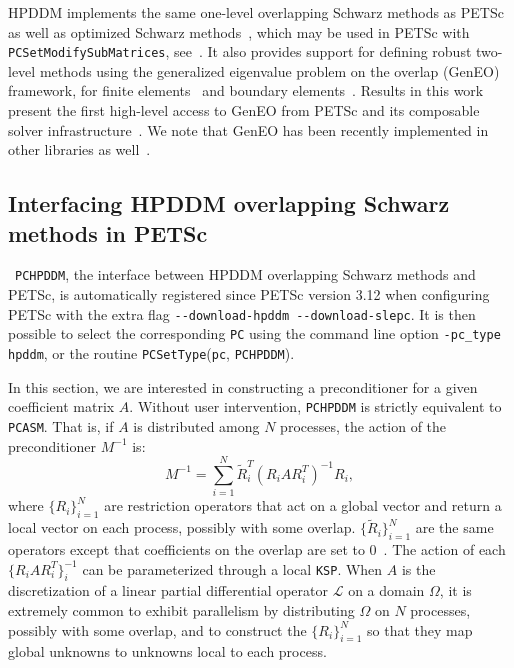 \documentclass[3p,11pt]{elsarticle}
\newcommand{\pk}[1]{\texttt{#1}}
\begin{document}
HPDDM implements the same one-level overlapping Schwarz methods as PETSc as
well as optimized Schwarz methods~\cite{gander2006optimized}, which may be used
in PETSc with \pk{PCSetModifySubMatrices}, see~\cite{gander2019new}.  It also provides support for
defining robust two-level methods using the generalized eigenvalue problem on
the overlap (GenEO) framework, for finite
elements~\cite{spillane2011robust,spillane2013abstract} and boundary
elements~\cite{marchand2019two}. Results in this work present the first
high-level access to GenEO from PETSc and its composable solver
infrastructure~\cite{brown2012composable}. We note that GenEO has been
recently implemented in other libraries as well~\cite{butler2020high}.

  \subsection{Interfacing HPDDM overlapping Schwarz methods in PETSc\label{sec:interface-pc}}\
\pk{PCHPDDM}, the interface between HPDDM overlapping Schwarz methods and
PETSc, is automatically registered since PETSc version 3.12 when configuring
PETSc with the extra flag \pk{-{}-download-hpddm -{}-download-slepc}.  It is
then possible to select the corresponding \pk{PC} using the command line option
\pk{-pc\_type hpddm}, or the routine \pk{PCSetType}(\pk{pc}, \pk{PCHPDDM}).

In this section, we are interested in constructing a preconditioner
for a given coefficient matrix $A$. Without user intervention,
\pk{PCHPDDM} is strictly equivalent to \pk{PCASM}. That is, if $A$ is distributed among
$N$ processes, the action of the preconditioner $M^{-1}$ is:
\begin{equation}\label{eq:one}
    M^{-1} = \sum_{i = 1}^N \tilde{R}_i^T (R_i A R_i^T)^{-1} R_i,
\end{equation}
where $\{R_i\}_{i=1}^N$ are restriction operators that act on a global vector and
return a local vector on each process, possibly with some overlap.
$\{\tilde{R}_i\}_{i=1}^N$ are the same operators except that coefficients on the
overlap are set to 0~\cite{cai1999restricted}. The action of each $\{R_i A R_i^T\}^{-1}_{i}$
can be parameterized through a local \pk{KSP}. When $A$ is the
discretization of a linear partial differential operator $\mathcal{L}$ on a domain $\Omega$, it is
extremely common to exhibit parallelism by distributing $\Omega$ on $N$
processes, possibly with some overlap, and to construct the $\{R_i\}_{i=1}^N$ so
that they map global unknowns to unknowns local to each process.
\end{document}
